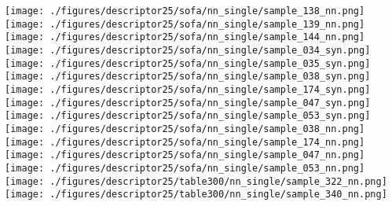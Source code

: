\documentclass[10pt,twocolumn,letterpaper]{article}
\begin{document}
\begin{figure*}[h]
    \texttt{[image: ./figures/descriptor25/sofa/nn\_single/sample\_138\_nn.png]}           \hspace{-1mm}
     \texttt{[image: ./figures/descriptor25/sofa/nn\_single/sample\_139\_nn.png]}           \hspace{-1mm}
     \texttt{[image: ./figures/descriptor25/sofa/nn\_single/sample\_144\_nn.png]}           
     \texttt{[image: ./figures/descriptor25/sofa/nn\_single/sample\_034\_syn.png]}           \hspace{-1mm}  
      \texttt{[image: ./figures/descriptor25/sofa/nn\_single/sample\_035\_syn.png]}           \hspace{-1mm}    
      \texttt{[image: ./figures/descriptor25/sofa/nn\_single/sample\_038\_syn.png]}           \hspace{-1mm}
      \texttt{[image: ./figures/descriptor25/sofa/nn\_single/sample\_174\_syn.png]}           \hspace{-1mm}     
      \texttt{[image: ./figures/descriptor25/sofa/nn\_single/sample\_047\_syn.png]}           \hspace{-1mm} 
      \texttt{[image: ./figures/descriptor25/sofa/nn\_single/sample\_053\_syn.png]}           
      \texttt{[image: ./figures/descriptor25/sofa/nn\_single/sample\_038\_nn.png]}           \hspace{-1mm}
      \texttt{[image: ./figures/descriptor25/sofa/nn\_single/sample\_174\_nn.png]}           \hspace{-1mm}     
      \texttt{[image: ./figures/descriptor25/sofa/nn\_single/sample\_047\_nn.png]}           \hspace{-1mm} 
      \texttt{[image: ./figures/descriptor25/sofa/nn\_single/sample\_053\_nn.png]}           \hspace{-1mm}     
      \\
      \texttt{[image: ./figures/descriptor25/table300/nn\_single/sample\_322\_nn.png]}           \hspace{-1mm} 
      \texttt{[image: ./figures/descriptor25/table300/nn\_single/sample\_340\_nn.png]}           \hspace{-1mm} 

\end{figure*}
\end{document}
